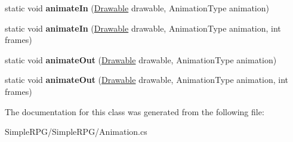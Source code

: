\begin{DoxyCompactItemize}
\item 
\hypertarget{class_simple_r_p_g_1_1_animation_a57887aeb5e46066b4426e2fa8d715175}{static void {\bfseries animate\-In} (\hyperlink{class_simple_r_p_g_1_1_drawable}{Drawable} drawable, Animation\-Type animation)}\label{class_simple_r_p_g_1_1_animation_a57887aeb5e46066b4426e2fa8d715175}

\item 
\hypertarget{class_simple_r_p_g_1_1_animation_a45e21ce9caf65cc315313632a1ecb201}{static void {\bfseries animate\-In} (\hyperlink{class_simple_r_p_g_1_1_drawable}{Drawable} drawable, Animation\-Type animation, int frames)}\label{class_simple_r_p_g_1_1_animation_a45e21ce9caf65cc315313632a1ecb201}

\item 
\hypertarget{class_simple_r_p_g_1_1_animation_a3fa90da4edd15c14c9a84ade2274dba0}{static void {\bfseries animate\-Out} (\hyperlink{class_simple_r_p_g_1_1_drawable}{Drawable} drawable, Animation\-Type animation)}\label{class_simple_r_p_g_1_1_animation_a3fa90da4edd15c14c9a84ade2274dba0}

\item 
\hypertarget{class_simple_r_p_g_1_1_animation_a7b584db5a90bc132011bb3f630193d4d}{static void {\bfseries animate\-Out} (\hyperlink{class_simple_r_p_g_1_1_drawable}{Drawable} drawable, Animation\-Type animation, int frames)}\label{class_simple_r_p_g_1_1_animation_a7b584db5a90bc132011bb3f630193d4d}

\end{DoxyCompactItemize}


The documentation for this class was generated from the following file\-:\begin{DoxyCompactItemize}
\item 
Simple\-R\-P\-G/\-Simple\-R\-P\-G/Animation.\-cs\end{DoxyCompactItemize}
